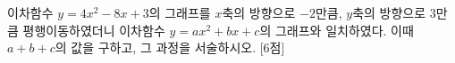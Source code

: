 이차함수 $y=4x^2-8x+3$의 그래프를 $x$축의 방향으로 $-2$만큼, $y$축의 방향으로 $3$만큼 평행이동하였더니 이차함수 $y=ax^2+bx+c$의 그래프와 일치하였다. 이때 $a+b+c$의 값을 구하고, 그 과정을 서술하시오.  \mbox{[6점]}
